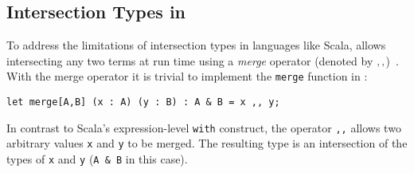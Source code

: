 

\subsection{Intersection Types in \name}


To address the limitations of intersection types in languages like
Scala, \name allows intersecting any two terms at run time using a
\emph{merge} operator (denoted by $ ,, $)~\cite{dunfield2014elaborating}.  With the merge 
operator it is trivial to implement the \lstinline{merge} function in \name:

\begin{lstlisting}
let merge[A,B] (x : A) (y : B) : A & B = x ,, y;
\end{lstlisting}

\noindent In contrast to Scala's expression-level \lstinline{with}
construct, the operator \lstinline{,,} allows two arbitrary values \lstinline{x} 
and \lstinline{y} to be merged. The resulting type is an
intersection of the types of  \lstinline{x} 
and \lstinline{y} (\lstinline{A & B} in this case).

